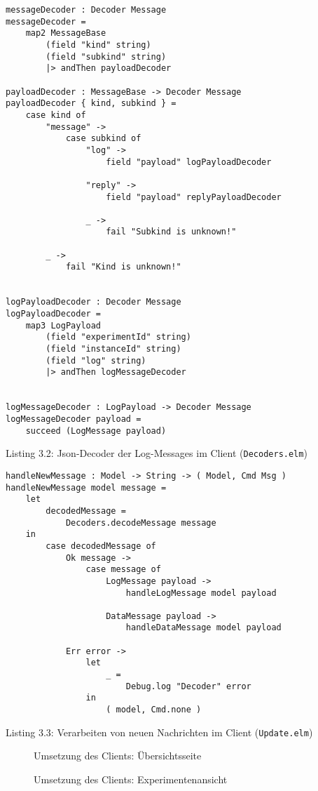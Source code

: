 \begin{verbatim}
messageDecoder : Decoder Message
messageDecoder =
    map2 MessageBase
        (field "kind" string)
        (field "subkind" string)
        |> andThen payloadDecoder

payloadDecoder : MessageBase -> Decoder Message
payloadDecoder { kind, subkind } =
    case kind of
        "message" ->
            case subkind of
                "log" ->
                    field "payload" logPayloadDecoder

                "reply" ->
                    field "payload" replyPayloadDecoder

                _ ->
                    fail "Subkind is unknown!"

        _ ->
            fail "Kind is unknown!"


logPayloadDecoder : Decoder Message
logPayloadDecoder =
    map3 LogPayload
        (field "experimentId" string)
        (field "instanceId" string)
        (field "log" string)
        |> andThen logMessageDecoder


logMessageDecoder : LogPayload -> Decoder Message
logMessageDecoder payload =
    succeed (LogMessage payload)
\end{verbatim}
\begin{center}
  Listing 3.2: Json-Decoder der Log-Messages im Client (\texttt{Decoders.elm})
\end{center}
\clearpage
\begin{verbatim}
handleNewMessage : Model -> String -> ( Model, Cmd Msg )
handleNewMessage model message =
    let
        decodedMessage =
            Decoders.decodeMessage message
    in
        case decodedMessage of
            Ok message ->
                case message of
                    LogMessage payload ->
                        handleLogMessage model payload

                    DataMessage payload ->
                        handleDataMessage model payload

            Err error ->
                let
                    _ =
                        Debug.log "Decoder" error
                in
                    ( model, Cmd.none )
\end{verbatim}
\begin{center}
  Listing 3.3: Verarbeiten von neuen Nachrichten im Client (\texttt{Update.elm})
\end{center}

\begin{landscape}
  \begin{figure}[h]
    \centering
    \par
    \caption{Umsetzung des Clients: Übersichtsseite}
    \label{fig:dev-view-1}
  \end{figure}
  \begin{figure}[h]
    \centering
    \par
    \caption{Umsetzung des Clients: Experimentenansicht}
    \label{fig:dev-view-2}
  \end{figure}
\end{landscape}
